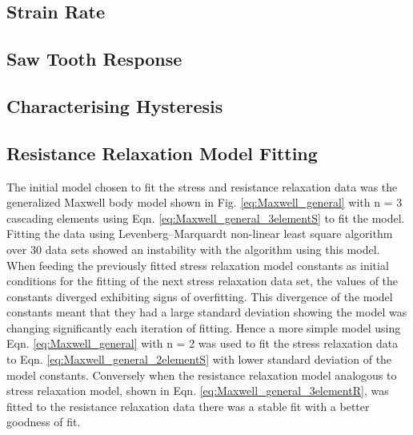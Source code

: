 \subsection{Strain Rate}


\subsection{Saw Tooth Response}


\subsection{Characterising Hysteresis}


\subsection{Resistance Relaxation Model Fitting}
The initial model chosen to fit the stress and resistance relaxation data was the generalized Maxwell body model shown in Fig. \ref{eq:Maxwell_general} with n = 3 cascading elements using Eqn. \ref{eq:Maxwell_general_3elementS} to fit the model. Fitting the data using Levenberg–Marquardt non-linear least square algorithm over 30 data sets showed an instability with the algorithm using this model. When feeding the previously fitted stress relaxation model constants as initial conditions for the fitting of the next stress relaxation data set, the values of the constants diverged exhibiting signs of overfitting. This divergence of the model constants meant that they had a large standard deviation showing the model was changing significantly each iteration of fitting. Hence a more simple model using Eqn. \ref{eq:Maxwell_general} with n = 2 was used to fit the stress relaxation data to Eqn. \ref{eq:Maxwell_general_2elementS} with lower standard deviation of the model constants. Conversely when the resistance relaxation model analogous to stress relaxation model, shown in Eqn. \ref{eq:Maxwell_general_3elementR}, was fitted to the resistance relaxation data there was a stable fit with a better goodness of fit.

